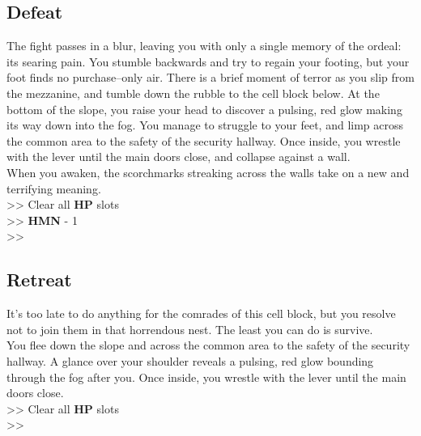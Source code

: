 \subsection*{Defeat}
The fight passes in a blur, leaving you with only a single memory of the ordeal: its searing pain. You stumble backwards and try to regain your footing, but your foot finds no purchase--only air. There is a brief moment of terror as you slip from the mezzanine, and tumble down the rubble to the cell block below. At the bottom of the slope, you raise your head to discover a pulsing, red glow making its way down into the fog. You manage to struggle to your feet, and limp across the common area to the safety of the security hallway. Once inside, you wrestle with the lever until the main doors close, and collapse against a wall.\\

When you awaken, the scorchmarks streaking across the walls take on a new and terrifying meaning.\\

>> Clear all \textbf{HP} slots\\
>> \textbf{HMN} - 1\\
>> 

\subsection*{Retreat}
It’s too late to do anything for the comrades of this cell block, but you resolve not to join them in that horrendous nest. The least you can do is survive.\\

You flee down the slope and across the common area to the safety of the security hallway. A glance over your shoulder reveals a pulsing, red glow bounding through the fog after you. Once inside, you wrestle with the lever until the main doors close.\\

>> Clear all \textbf{HP} slots\\
>> 
